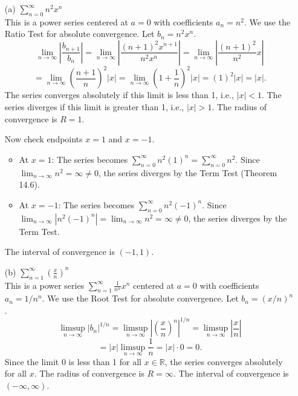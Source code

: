 \documentclass{article}
\newcommand{\R}{\mathbb{R}}
\begin{document}
\begin{enumerate}
  \item[(a)] \(\sum_{n=0}^\infty n^2 x^n\) \\
    This is a power series centered at \(a=0\) with coefficients \(a_n = n^2\).
    We use the Ratio Test for absolute convergence. Let \(b_n = n^2 x^n\).
    \[ \lim_{n\to\infty} \left| \frac{b_{n+1}}{b_n} \right| = \lim_{n\to\infty} \left| \frac{(n+1)^2 x^{n+1}}{n^2 x^n} \right| = \lim_{n\to\infty} \left| \frac{(n+1)^2}{n^2} x \right| \]
    \[ = \lim_{n\to\infty} \left( \frac{n+1}{n} \right)^2 |x| = \lim_{n\to\infty} \left( 1 + \frac{1}{n} \right)^2 |x| = (1)^2 |x| = |x|. \]
    The series converges absolutely if this limit is less than 1, i.e., \(|x| < 1\).
    The series diverges if this limit is greater than 1, i.e., \(|x| > 1\).
    The radius of convergence is \(R = 1\).

    Now check endpoints \(x = 1\) and \(x = -1\).
    \begin{itemize}
        \item At \(x = 1\): The series becomes \(\sum_{n=0}^\infty n^2 (1)^n = \sum_{n=0}^\infty n^2\). Since \(\lim_{n\to\infty} n^2 = \infty \ne 0\), the series diverges by the Term Test (Theorem 14.6).
        \item At \(x = -1\): The series becomes \(\sum_{n=0}^\infty n^2 (-1)^n\). Since \(\lim_{n\to\infty} |n^2 (-1)^n| = \lim_{n\to\infty} n^2 = \infty \ne 0\), the series diverges by the Term Test.
    \end{itemize}
    The interval of convergence is \((-1, 1)\).

  \item[(b)] \(\sum_{n=1}^\infty \left(\frac{x}{n}\right)^n\) \\
    This is a power series \(\sum_{n=1}^\infty \frac{1}{n^n} x^n\) centered at \(a=0\) with coefficients \(a_n = 1/n^n\).
    We use the Root Test for absolute convergence. Let \(b_n = (x/n)^n\).
    \[ \limsup_{n\to\infty} |b_n|^{1/n} = \limsup_{n\to\infty} \left| \left(\frac{x}{n}\right)^n \right|^{1/n} = \limsup_{n\to\infty} \left| \frac{x}{n} \right| \]
    \[ = |x| \limsup_{n\to\infty} \frac{1}{n} = |x| \cdot 0 = 0. \]
    Since the limit \(0\) is less than 1 for all \(x \in \R\), the series converges absolutely for all \(x\).
    The radius of convergence is \(R = \infty\).
    The interval of convergence is \((-\infty, \infty)\).


\end{enumerate}
\end{document}
